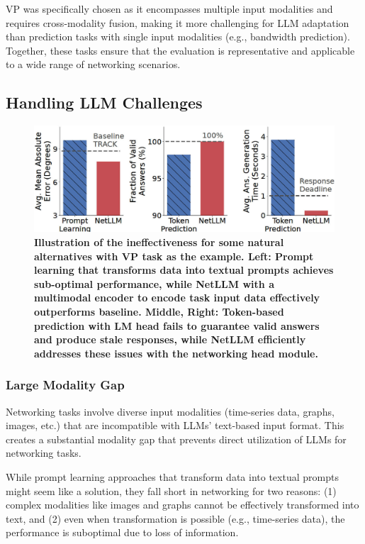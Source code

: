 \documentclass[twocolumn]{article}
\begin{document}
VP was specifically chosen as it encompasses multiple input modalities and requires cross-modality fusion, making it more challenging for LLM adaptation than prediction tasks with single input modalities (e.g., bandwidth prediction). Together, these tasks ensure that the evaluation is representative and applicable to a wide range of networking scenarios.

\subsection{Handling LLM Challenges}

\begin{figure}[t]
  \centering
  \includegraphics[width=1\linewidth]{img/figure2.jpg}
  \caption{\textbf{Illustration of the ineffectiveness for some natural alternatives with VP task as the example. Left: Prompt learning that transforms data into textual prompts achieves sub-optimal performance, while NetLLM with a multimodal encoder to encode task input data effectively outperforms baseline. Middle, Right: Token-based prediction with LM head fails to guarantee valid answers and produce stale responses, while NetLLM efficiently addresses these issues with the networking head module.}}
  \label{fig:2}
\end{figure}

\subsubsection{Large Modality Gap}
Networking tasks involve diverse input modalities (time-series data, graphs, images, etc.) that are incompatible with LLMs' text-based input format. This creates a substantial modality gap that prevents direct utilization of LLMs for networking tasks.

While prompt learning approaches that transform data into textual prompts might seem like a solution, they fall short in networking for two reasons: (1) complex modalities like images and graphs cannot be effectively transformed into text, and (2) even when transformation is possible (e.g., time-series data), the performance is suboptimal due to loss of information.
\end{document}
